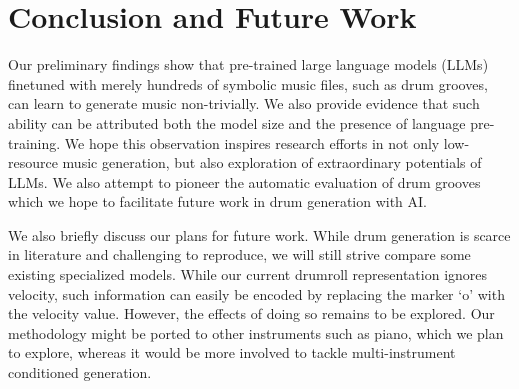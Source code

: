 \documentclass[letterpaper]{article} %
\begin{document}
\section{Conclusion and Future Work}
Our preliminary findings show that pre-trained large language models (LLMs) finetuned with merely hundreds of symbolic music files, such as drum grooves, can learn to generate music non-trivially. We also provide evidence that such ability can be attributed both the model size and the presence of language pre-training. We hope this observation inspires research efforts in not only low-resource music generation, but also exploration of extraordinary potentials of LLMs. We also attempt to pioneer the automatic evaluation of drum grooves which we hope to facilitate future work in drum generation with AI. 

We also briefly discuss our plans for future work. While drum generation is scarce in literature and challenging to reproduce, we will still strive compare some existing specialized models. While our current drumroll representation ignores velocity, such information can easily be encoded by replacing the marker `o' with the velocity value. However, the effects of doing so remains to be explored. Our methodology might be ported to other instruments such as piano, which we plan to explore, whereas it would be more involved to tackle multi-instrument conditioned generation.

\newpage
%

\end{document}
